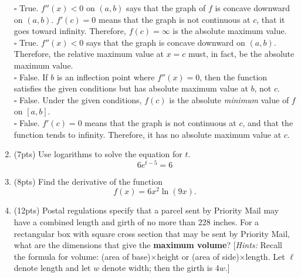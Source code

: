 \documentclass[fleqn,12pt]{article}
\newcommand{\<}{\ensuremath{\langle}}
\renewcommand{\>}{\ensuremath{\rangle}}
\begin{document}
\begin{enumerate}
\noindent $\square$ True. 
$f''(x) < 0$  on $(a, b)$ says that the graph of $f$ is concave downward on 
$(a,b)$.  $f'(c) = 0$ means that the graph is not continuous at $c$, that it goes toward infinity. 
Therefore, $f(c) =  \infty$  is the absolute maximum value.\\[5pt]
$\square$ True. 
$f''(x) < 0$  says that the graph is concave downward on $(a, b)$. 
Therefore, the relative maximum value at  $x = c$  must, in fact, be the absolute maximum value.    \\[5pt]
\noindent $\square$ False. If  $b$  is an inflection point where 
$f''(x) = 0$, then the function satisfies the given conditions but has
 absolute maximum value at $b$, not $c$.\\[5pt]
\noindent $\square$ False. Under the given conditions, 
$f(c)$ is the absolute \emph{minimum} value of $f$ on $[a,b]$.\\[5pt]
\noindent $\square$ False.  $f'(c) = 0$  means that the graph is not continuous at $c$,
and that the function tends to infinity. Therefore, it has no absolute maximum value at $c$.

\vskip5mm

\item %
(7pts)
Use logarithms to solve the equation for $t$.
\[
6e^{t-5} = 6
\]
\vskip3cm

\probskip
\item %
(8pts)
Find the derivative of the function
\[
f(x) = 6x^2 \ln(9x).
\]
\vfill
{}


\newpage
\item 
(12pts)
Postal regulations specify that a parcel sent by Priority Mail may have a
combined length and girth of no more than 228 inches. 
For a rectangular box with square cross section that may be sent by Priority
Mail, what are the dimensions that give the {\bf maximum volume}?
[{\it Hints:} Recall the formula for volume: (area of
  base)$\times$height or  (area of side)$\times$length. Let $\ell$ denote length and
  let $w$ denote width; then the girth is $4w$.]


\end{enumerate}
\end{document}
